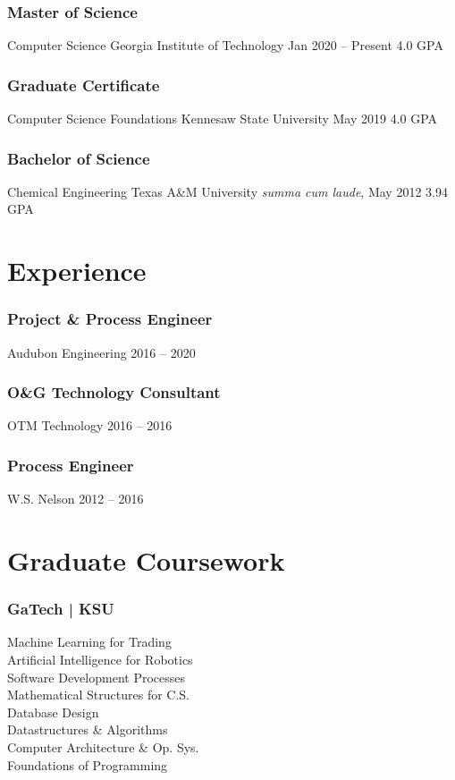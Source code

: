   \subsubsection{Master of Science} 
  \school%
    {Computer Science}%
    {Georgia Institute of Technology}%
    {Jan 2020 -- Present}%
    {4.0 GPA}
  \subsubsection{Graduate Certificate}
  \school%
    {Computer Science Foundations}%
    {Kennesaw State University}%
    {May 2019}%
    {4.0 GPA}
  \subsubsection{Bachelor of Science}
  \school%
    {Chemical Engineering}%
    {Texas A\&M University}%
    {\textit{summa cum laude}, May 2012}%
    {3.94 GPA}
\section{Experience}
  \subsubsection{Project \& Process Engineer}
  \position%
    {Audubon Engineering}%
    {2016 -- 2020}%
    \Location
  \subsubsection{O\&G Technology Consultant}
  \position%
    {OTM Technology}%
    {2016 -- 2016}%
    \Location
  \subsubsection{Process Engineer}
  \position%
    {W.S. Nelson}%
    {2012 -- 2016}%
    \Location
\section{Graduate Coursework}
  \subsubsection{GaTech | KSU}
      {\vspace{0.1em}}
      Machine Learning for Trading\\
      Artificial Intelligence for Robotics\\
      Software Development Processes\\
      Mathematical Structures for C.S.\\
      Database Design\\
      Datastructures \& Algorithms\\
      Computer Architecture \& Op. Sys.\\
      Foundations of Programming\\
